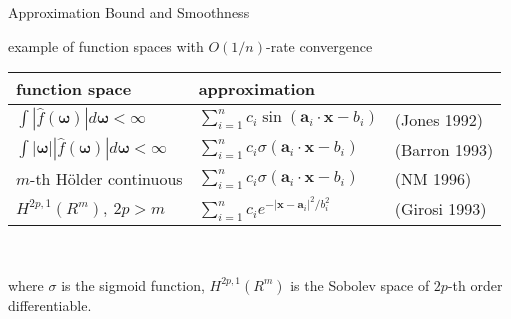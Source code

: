 \documentclass[fleqn,aspectratio=1610]{beamer}
\begin{document}
\begin{frame}[label={sec:org3b7d31e}]{Approximation Bound and Smoothness}
\begin{center}
example of function spaces with \(O(1/n)\)-rate convergence 
\end{center}
\begin{center}
\small
\begin{tabular}[h]{lll}
  \hline
  function space
  & approximation & \\
  \hline
  \(\displaystyle\int|\hat{f}(\boldsymbol\omega)|d\boldsymbol\omega
  < \infty\)
  &\(\displaystyle %
    \sum_{i=1}^n c_i\sin(\boldsymbol{a}_i\cdot\boldsymbol{x}-b_i)\)
                  & (Jones 1992)\\
  \(\displaystyle\int|\boldsymbol\omega||\hat{f}(\boldsymbol\omega)|d\boldsymbol\omega
  < \infty\)
  &\(\displaystyle %
    \sum_{i=1}^n c_i\sigma(\boldsymbol{a}_i\cdot\boldsymbol{x}-b_i)\)
                  & (Barron 1993)\\
  \(m\)-th H\"older continuous
  &\(\displaystyle %
    \sum_{i=1}^n c_i\sigma(\boldsymbol{a}_i\cdot\boldsymbol{x}-b_i)\)
                  & (NM 1996)\\
  \(\displaystyle H^{2p,1}(R^m),\ 2p>m\)
  &\(\displaystyle %
    \sum_{i=1}^n c_i e^{-|\boldsymbol{x}-\boldsymbol{a}_i|^2/b_i^2}\)
                  & (Girosi 1993)\\
  \hline
\end{tabular}
\\[3pt]
\begin{minipage}[h]{.7\linewidth}
  where \(\sigma\) is the sigmoid function,
  \(H^{2p,1}(R^m)\) is the Sobolev space of
  \(2p\)-th order differentiable.
\end{minipage}
\end{center}
\nocite{Murata1996}
\end{frame}
\end{document}

